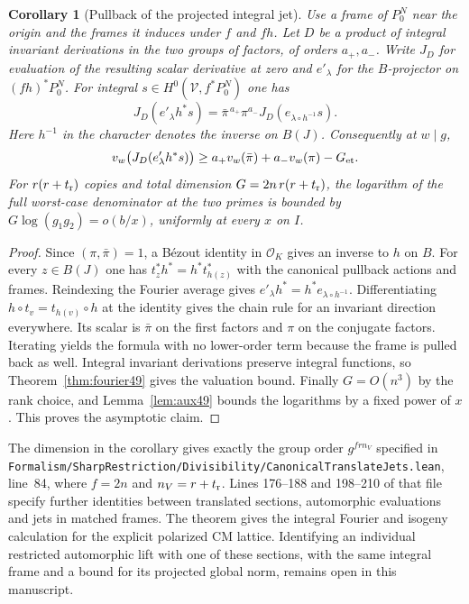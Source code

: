 \documentclass[a4paper,11pt]{article}
\newtheorem{corollary}[proposition]{Corollary}
\theoremstyle{definition}
\theoremstyle{remark}
\newcommand{\srcloc}[2]{{\small\nolinkurl{#1.lean}}, line~#2}
\numberwithin{equation}{section}
\newcommand{\OO}{\mathcal O}
\begin{document}
\begin{corollary}[Pullback of the projected integral jet]\label{cor:jet49}
Use a frame of \(P_0^N\) near the origin and the frames it induces under
\(f\) and \(fh\). Let \(D\) be a product of integral invariant
derivations in the two groups of factors, of orders \(a_+,a_-\).
Write \(J_D\) for evaluation of the resulting scalar derivative at
zero and \(e'_\lambda\) for the \(B\)-projector on \((fh)^*P_0^N\).
For integral \(s\in H^0(\mathcal V,f^*P_0^N)\) one has
\[
 J_D(e'_\lambda h^*s)=
   \bar\pi^{\,a_+}\pi^{a_-} J_D(e_{\lambda\circ h^{-1}}s).
\]
Here \(h^{-1}\) in the character denotes the inverse on \(B(J)\).
Consequently at \(w\mid g\),
\[
 v_w\bigl(J_D(e'_\lambda h^*s)\bigr)\ge
       a_+v_w(\bar\pi)+a_-v_w(\pi)-G_{\rm et}.
\]
For \(r(r+t_{\rm r})\) copies and total dimension
\(G=2n\,r(r+t_{\rm r})\), the logarithm of the full worst-case
denominator at the two primes is bounded by
\(G\log(g_1g_2)=o(b/x)\), uniformly at every \(x\) on \(I\).
\end{corollary}
\begin{proof}
Since \((\pi,\bar\pi)=1\), a B\'ezout identity in \(\OO_K\) gives an
inverse to \(h\) on \(B\). For every \(z\in B(J)\) one has
\(t_z^*h^*=h^*t_{h(z)}^*\) with the canonical pullback actions
and frames. Reindexing the Fourier average gives
\(e'_\lambda h^*=h^*e_{\lambda\circ h^{-1}}\).
Differentiating \(h\circ t_v=t_{h(v)}\circ h\) at the identity
gives the chain rule for an invariant direction everywhere.
Its scalar is \(\bar\pi\) on the first factors and \(\pi\) on the
conjugate factors. Iterating yields the formula with no lower-order
term because the frame is pulled back as well. Integral invariant
derivations preserve integral functions, so Theorem~\ref{thm:fourier49}
gives the valuation bound. Finally \(G=O(n^3)\) by the rank choice,
and Lemma~\ref{lem:aux49} bounds the logarithms by a fixed power of
\(x\). This proves the asymptotic claim.
\end{proof}

The dimension in the corollary gives exactly the group order
\(g^{f r n_V}\) specified in
\srcloc{Formalism/SharpRestriction/Divisibility/CanonicalTranslateJets}{84},
where \(f=2n\) and \(n_V=r+t_{\rm r}\). Lines 176--188 and 198--210
of that file specify further identities between translated sections,
automorphic evaluations and jets in matched frames. The theorem gives
the integral Fourier and isogeny calculation for the explicit polarized
CM lattice. Identifying an individual restricted automorphic lift with
one of these sections, with the same integral frame and a bound for
its projected global norm, remains open in this manuscript.
\end{document}
